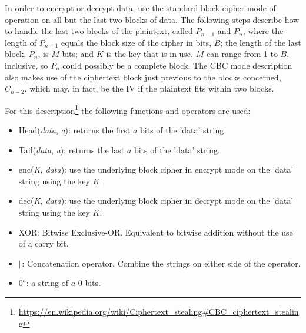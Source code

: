 In order to encrypt or decrypt data, use the standard block cipher mode of operation on all but the last two blocks of data.
The following steps describe how to handle the last two blocks of the plaintext, called \(P_{n-1}\) and \(P_n\), where the length of \(P_{n-1}\) equals the block size of the cipher in bits, \(B\); the length of the last block, \(P_n\), is \(M\) bits; and \(K\) is the key that is in use. \(M\) can range from 1 to \(B\), inclusive, so \(P_n\) could possibly be a complete block. The CBC mode description also makes use of the ciphertext block just previous to the blocks concerned, \(C_{n-2}\), which may, in fact, be the IV if the plaintext fits within two blocks.

For this description\footnote{\url{https://en.wikipedia.org/wiki/Ciphertext_stealing\#CBC_ciphertext_stealing}} the following functions and operators are used:

\begin{itemize}
    \item Head(\textit{data}, \textit{a}): returns the first \(a\) bits of the 'data' string.
    \item Tail(\textit{data}, \textit{a}): returns the last \(a\) bits of the 'data' string.
    \item enc(\textit{K, data}): use the underlying block cipher in encrypt mode on the 'data' string using the key \(K\).
    \item dec(\textit{K, data}): use the underlying block cipher in decrypt mode on the 'data' string using the key \(K\).
    \item XOR: Bitwise Exclusive-OR. Equivalent to bitwise addition without the use of a carry bit.
    \item \( \Vert \): Concatenation operator. Combine the strings on either side of the operator.
    \item \(0^a\): a string of \(a\) 0 bits.
\end{itemize}



